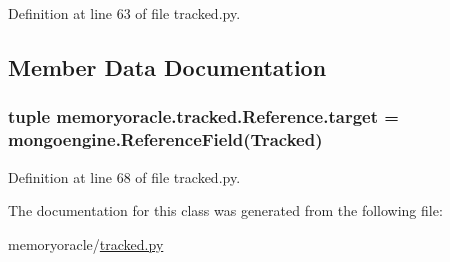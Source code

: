 Definition at line 63 of file tracked.\+py.



\subsection{Member Data Documentation}
\hypertarget{classmemoryoracle_1_1tracked_1_1Reference_aa3bb76fd8a4e9a211125c1f04fc61983}{}
\subsubsection[{target}]{\setlength{\rightskip}{0pt plus 5cm}tuple memoryoracle.\+tracked.\+Reference.\+target = mongoengine.\+Reference\+Field({\bf Tracked})\hspace{0.3cm}{\ttfamily [static]}}\label{classmemoryoracle_1_1tracked_1_1Reference_aa3bb76fd8a4e9a211125c1f04fc61983}


Definition at line 68 of file tracked.\+py.



The documentation for this class was generated from the following file\+:\begin{DoxyCompactItemize}
\item 
memoryoracle/\hyperlink{tracked_8py}{tracked.\+py}\end{DoxyCompactItemize}
